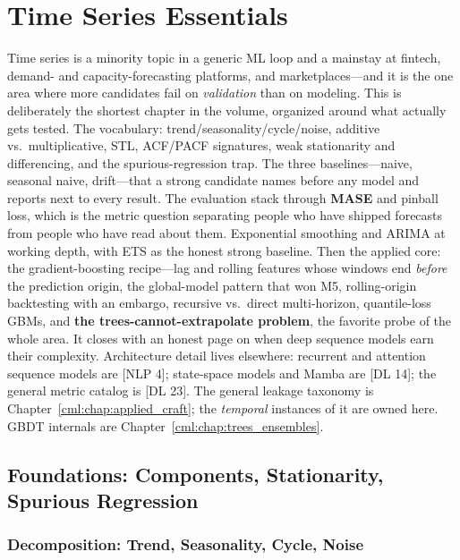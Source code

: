 \chapter{Time Series Essentials}
\label{cml:chap:time_series}

\begin{tldr}
Time series is a minority topic in a generic ML loop and a mainstay at fintech, demand- and capacity-forecasting platforms, and marketplaces---and it is the one area where more candidates fail on \emph{validation} than on modeling. This is deliberately the shortest chapter in the volume, organized around what actually gets tested. The vocabulary: trend/seasonality/cycle/noise, additive vs.\ multiplicative, STL, ACF/PACF signatures, weak stationarity and differencing, and the spurious-regression trap. The three baselines---naive, seasonal naive, drift---that a strong candidate names before any model and reports next to every result. The evaluation stack through \textbf{MASE} and pinball loss, which is the metric question separating people who have shipped forecasts from people who have read about them. Exponential smoothing and ARIMA at working depth, with ETS as the honest strong baseline. Then the applied core: the gradient-boosting recipe---lag and rolling features whose windows end \emph{before} the prediction origin, the global-model pattern that won M5, rolling-origin backtesting with an embargo, recursive vs.\ direct multi-horizon, quantile-loss GBMs, and \textbf{the trees-cannot-extrapolate problem}, the favorite probe of the whole area. It closes with an honest page on when deep sequence models earn their complexity. Architecture detail lives elsewhere: recurrent and attention sequence models are [NLP 4]; state-space models and Mamba are [DL 14]; the general metric catalog is [DL 23]. The general leakage taxonomy is Chapter~\ref{cml:chap:applied_craft}; the \emph{temporal} instances of it are owned here. GBDT internals are Chapter~\ref{cml:chap:trees_ensembles}.
\end{tldr}

\section{Foundations: Components, Stationarity, Spurious Regression}
\label{cml:sec:ts_foundations}

\subsection{Decomposition: Trend, Seasonality, Cycle, Noise}


